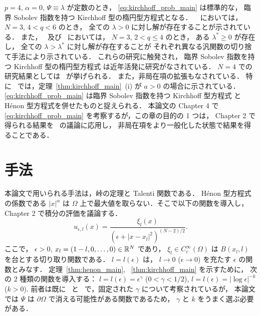 $p = 4$, $\alpha = 0$, $\Psi \equiv \lambda$ が定数のとき，
\eqref{eq:kirchhoff_prob_main} は標準的な，
臨界 Sobolev 指数を持つ Kirchhoff 型の楕円型方程式となる．
~\cite{MR3278854} においては，
$N = 3$, $4 < q < 6$ のとき，
全ての $\lambda > 0$ に対し解が存在することが示されている．
また，~\cite{MR3018020} 及び~\cite{MR3278854} においては，
$N = 3$, $2 < q \leq 4$ のとき，
ある $\lambda^* \geq 0$ が存在し，
全ての $\lambda > \lambda^*$ に対し解が存在することが
それぞれ異なる汎関数の切り捨て手法により示されている．
これらの研究に触発され，
臨界 Sobolev 指数を持つ Kirchhoff 型の楕円型方程式
は近年活発に研究がなされている．
$N = 4$ での研究結果としては~\cite{MR3210026} が挙げられる．
また，非局在項の拡張もなされている．
特に~\cite{MR3539075} では，定理~\ref{thm:kirchhoff_main}~(i) が
$a > 0$ の場合に示されている．
\eqref{eq:kirchhoff_prob_main}
は臨界 Sobolev 指数を持つ Kirchhoff 型方程式
と Hénon 型方程式を併せたものと捉えられる．
本論文の Chapter 4 で
\eqref{eq:kirchhoff_prob_main} を考察するが，この章の目的の 1 つは，
Chapter 2 で得られる結果を~\cite{MR3278854} の議論に応用し，
非局在項をより一般化した状態で結果を得ることである．

\section{手法}

本論文で用いられる手法は，峠の定理と Talenti 関数である．
Hénon 型方程式の係数である $\lvert x \rvert^\alpha$ は
$\Omega$ 上で最大値を取らない．そこで以下の関数を導入し，
Chapter 2 で積分の評価を議論する．
\[
  u_{\epsilon, l}(x) = \frac{\xi_l(x)}{\left(\epsilon +
    \left\lvert x - x_l \right\rvert^2 \right)^{(N-2)/2}}.
\]
ここで， $\epsilon > 0$, $x_l = (1-l, 0, \dots, 0) \in \mathbb{R}^N$ であり，
$\xi_l \in C^\infty_c (\Omega)$ は
$B(x_l, l)$ を台とする切り取り関数である．
$l = l(\epsilon)$ は，
$l \to 0$ ($\epsilon \to 0$) を充たす
$\epsilon$ の関数とみなす．
定理~\ref{thm:henon_main}, ~\ref{thm:kirchhoff_main} を示すために，
次の $2$ 種類の関数を導入する：
$l = l(\epsilon) = \epsilon^\gamma$ ($0 < \gamma < 1/2$),
$l = l(\epsilon) = \lvert \log \epsilon \rvert^{-k}$ ($k > 0$).
前者は既に~\cite{MR2951742} と~\cite{MR2951722}
で，固定された $\gamma$ について考察されているが，
本論文では $\Psi$ は $\partial \Omega$ で消える可能性がある関数であるため，
$\gamma$ と $k$ をうまく選ぶ必要がある．

